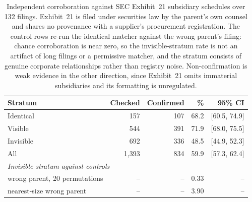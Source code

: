 \begin{table}[t]
\centering
\small
\begin{tabular}{lrrrr}
\toprule
Stratum & Checked & Confirmed & \% & 95\% CI \\
\midrule
Identical & 157 & 107 & 68.2 & [60.5, 74.9] \\
Visible & 544 & 391 & 71.9 & [68.0, 75.5] \\
Invisible & 692 & 336 & 48.5 & [44.9, 52.3] \\
\midrule
All & 1,393 & 834 & 59.9 &
[57.3, 62.4] \\
\midrule
\multicolumn{5}{l}{\emph{Invisible stratum against controls}} \\
\quad wrong parent, 20 permutations & -- & -- &
0.33 & -- \\
\quad nearest-size wrong parent & -- & -- &
3.90 & -- \\
\bottomrule
\end{tabular}
\caption{Independent corroboration against SEC Exhibit~21 subsidiary schedules over
132 filings. Exhibit~21 is filed under securities law by the
parent's own counsel and shares no provenance with a supplier's procurement
registration. The control rows re-run the identical matcher against the wrong parent's
filing: chance corroboration is near zero, so the invisible-stratum rate is not an
artifact of long filings or a permissive matcher, and the stratum consists of genuine
corporate relationships rather than registry noise. Non-confirmation is weak evidence
in the other direction, since Exhibit~21 omits immaterial subsidiaries and its
formatting is unregulated.}
\label{tab:edgar}
\end{table}
